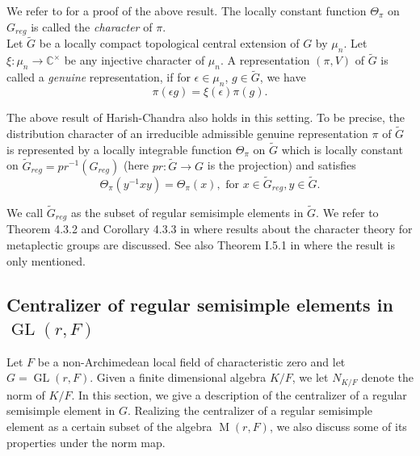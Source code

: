 \documentclass[11pt, a4paper, reqno]{amsart}
\theoremstyle{definition}
\theoremstyle{remark}
\theoremstyle{example}
\theoremstyle{note}
\numberwithin{equation}{section}
\DeclareMathOperator{\GL}{GL}
\DeclareMathOperator{\M}{M}
\begin{document}
We refer to \cite{Har} for a proof of the above result. The locally constant function $\Theta_{\pi}$ on $G_{reg}$ is called the \textit{character} of $\pi$. \\

Let $\widetilde{G}$ be a locally compact topological central extension of $G$ by $\mu_{n}$. Let $\xi: \mu_{n}\rightarrow \mathbb{C}^{\times}$ be any injective character of $\mu_{n}$. A representation $(\pi,V)$ of $\widetilde{G}$ is called a \textit{genuine} representation, if for $\epsilon\in \mu_{n}$, $g\in \widetilde{G}$, we have
\[\pi(\epsilon g)=\xi(\epsilon)\pi(g).\]

\vspace{0.2cm}
 The above result of Harish-Chandra also holds in this setting. To be precise, the distribution character of an irreducible admissible genuine representation $\pi$ of $\widetilde{G}$ is represented by a locally integrable function $\Theta_{\pi}$ on $\widetilde{G}$ which is locally constant on $\widetilde{G}_{reg}= pr^{-1}(G_{reg})$ (here $pr: \widetilde{G}\rightarrow G$ is the projection) and satisfies
\[\Theta_{\pi}(y^{-1}xy)=\Theta_{\pi}(x), \textrm{ for } x\in \widetilde{G}_{reg}, y\in \widetilde{G}.\]

We call $\widetilde{G}_{reg}$ as the subset of regular semisimple elements in $\widetilde{G}$. We refer to Theorem 4.3.2 and Corollary 4.3.3 in \cite{Wen} where results about the character theory for metaplectic groups are discussed. See also Theorem I.5.1 in \cite{KazPat[2]} where the result is only mentioned. 


 
\subsection{Centralizer of regular semisimple elements in $\GL(r,F)$}\label{centralizer discussion}

Let $F$ be a non-Archimedean local field of characteristic zero and 
let $G=\GL(r,F)$. Given a finite dimensional algebra $K/F$, we let $N_{K/F}$ denote the norm of $K/F$. In this section, we give a description of the centralizer of a regular semisimple element in $G$. Realizing the centralizer of a regular semisimple element as a certain subset of the algebra $\M(r,F)$, we also discuss some of its properties under the norm map.  \\
\end{document}
